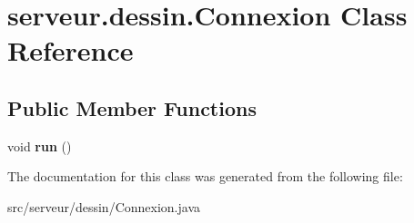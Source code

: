 \hypertarget{classserveur_1_1dessin_1_1_connexion}{}\section{serveur.\+dessin.\+Connexion Class Reference}
\label{classserveur_1_1dessin_1_1_connexion}
\subsection*{Public Member Functions}
\begin{DoxyCompactItemize}
\item 
\mbox{\label{classserveur_1_1dessin_1_1_connexion_a1ec8e4bbb4940314f25ceaec696d456e}} 
void {\bfseries run} ()
\end{DoxyCompactItemize}


The documentation for this class was generated from the following file\+:\begin{DoxyCompactItemize}
\item 
src/serveur/dessin/Connexion.\+java\end{DoxyCompactItemize}
